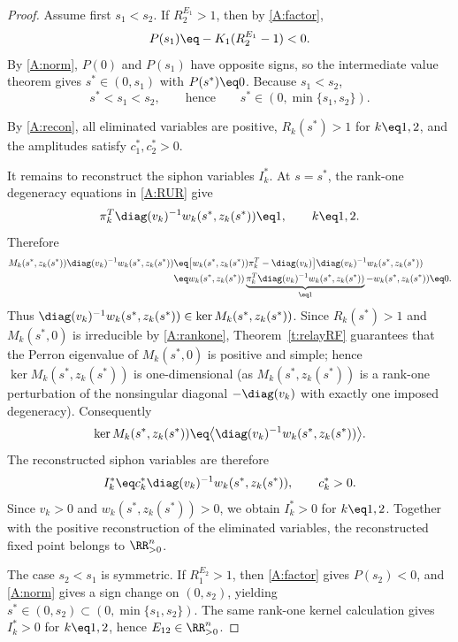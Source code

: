 \begin{proof}
Assume first $s_1<s_2$.  If $R_2^{E_1}>1$, then by \ref{A:factor},
\[
        P(s_1)\eq-K_1(R_2^{E_1}-1)<0.
\]
By \ref{A:norm}, $P(0)$ and $P(s_1)$ have opposite signs, so the
intermediate value theorem gives $s^*\in(0,s_1)$ with $P(s^*)\eq0$.
Because $s_1<s_2$,
\[
        s^*<s_1<s_2,
        \qquad\text{hence}\qquad
        s^*\in(0,\min\{s_1,s_2\}).
\]

By \ref{A:recon}, all eliminated variables are positive,
$R_k(s^*)>1$ for $k\eq1,2$, and the amplitudes satisfy
$c_1^*,c_2^*>0$.

It remains to reconstruct the siphon variables $I_k^*$.
At $s=s^*$, the rank-one degeneracy equations in \ref{A:RUR} give
\[
        \pi_k^T\diag(v_k)^{-1}w_k(s^*,z_k(s^*))\eq1,
        \qquad k\eq1,2.
\]
Therefore
\begin{align*}
        M_k(s^*,z_k(s^*))
        \diag(v_k)^{-1}w_k(s^*,z_k(s^*))
        &\eq
        \bigl[w_k(s^*,z_k(s^*))\pi_k^T-\diag(v_k)\bigr]
        \diag(v_k)^{-1}w_k(s^*,z_k(s^*))
        \\
        &\eq
        w_k(s^*,z_k(s^*))
        \underbrace{\pi_k^T\diag(v_k)^{-1}w_k(s^*,z_k(s^*))}_{\eq1}
        -w_k(s^*,z_k(s^*))
        \eq0.
\end{align*}
Thus $\diag(v_k)^{-1}w_k(s^*,z_k(s^*))\in\ker M_k(s^*,z_k(s^*))$.
Since $R_k(s^*)>1$ and $M_k(s^*,0)$ is irreducible by \ref{A:rankone},
Theorem~\ref{t:relayRF} guarantees that the Perron eigenvalue of
$M_k(s^*,0)$ is positive and simple; hence $\ker M_k(s^*,z_k(s^*))$
is one-dimensional (as $M_k(s^*,z_k(s^*))$ is a rank-one perturbation
of the nonsingular diagonal $-\diag(v_k)$ with exactly one imposed
degeneracy).  Consequently
\[
        \ker M_k(s^*,z_k(s^*))
        \eq
        \bigl\langle
        \diag(v_k)^{-1}w_k(s^*,z_k(s^*))
        \bigr\rangle.
\]
The reconstructed siphon variables are therefore
\[
        I_k^*
        \eq
        c_k^*\diag(v_k)^{-1}w_k(s^*,z_k(s^*)),
        \qquad c_k^*>0.
\]
Since $v_k>0$ and $w_k(s^*,z_k(s^*))>0$, we obtain $I_k^*>0$ for
$k\eq1,2$.  Together with the positive reconstruction of the
eliminated variables, the reconstructed fixed point belongs to
$\RR^n_{>0}$.

The case $s_2<s_1$ is symmetric.  If $R_1^{E_2}>1$, then
\ref{A:factor} gives $P(s_2)<0$, and \ref{A:norm} gives a sign change
on $(0,s_2)$, yielding $s^*\in(0,s_2)\subset(0,\min\{s_1,s_2\})$.
The same rank-one kernel calculation gives $I_k^*>0$ for $k\eq1,2$,
hence $E_{12}\in\RR^n_{>0}$.
\end{proof}

